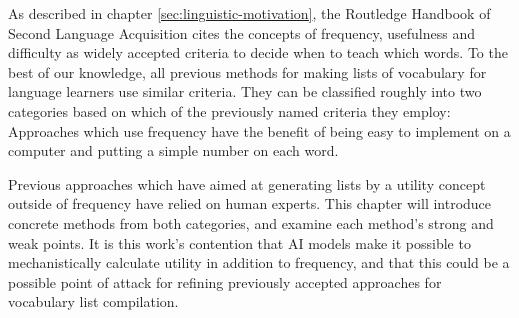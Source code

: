 
As described in chapter \ref{sec:linguistic-motivation}, the Routledge Handbook of Second Language Acquisition cites the concepts of frequency, usefulness and difficulty as widely accepted criteria to decide when to teach which words.
To the best of our knowledge, all previous methods for making lists of vocabulary for language learners use similar criteria.
They can be classified roughly into two categories based on which of the previously named criteria they employ:
Approaches which use frequency have the benefit of being easy to implement on a computer and putting a simple number on each word.

Previous approaches which have aimed at generating lists by a utility concept outside of frequency have relied on human experts.
This chapter will introduce concrete methods from both categories, and examine each method's strong and weak points.
It is this work's contention that AI models make it possible to mechanistically calculate utility in addition to frequency, and that this could be a possible point of attack for refining previously accepted approaches for vocabulary list compilation.



